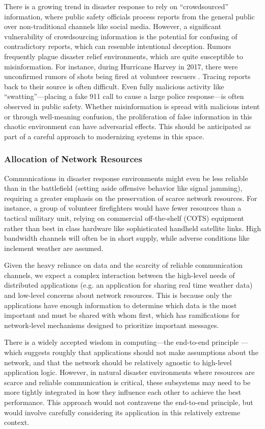 \documentclass[]             %
{NASA}                       %
\theoremstyle{definition}
\begin{document}
There is a growing trend in disaster response to rely on
``crowdsourced'' information, where public safety officials process
reports from the general public over non-traditional channels like
social media. However, a significant vulnerability of crowdsourcing
information is the potential for confusing of contradictory reports,
which can resemble intentional deception. Rumors frequently plague
disaster relief environments, which are quite susceptible to
misinformation. For instance, during Hurricane Harvey in 2017, there
were unconfirmed rumors of shots being fired at volunteer rescuers
\cite{2017:cajun-navy-rumors}. Tracing reports back to their source is
often difficult. Even fully malicious activity like
``swatting''---placing a fake 911 call to cause a large police
response---is often observed in public safety. Whether misinformation
is spread with malicious intent or through well-meaning confusion, the
proliferation of false information in this chaotic environment can
have adversarial effects. This should be anticipated as part of a
careful approach to modernizing systems in this space.

\subsubsection{Allocation of Network Resources}
\label{sssec:allocation-of-network-resource}
Communications in disaster response environments might even be less
reliable than in the battlefield (setting aside offensive behavior
like signal jamming), requiring a greater emphasis on the preservation
of scarce network resources. For instance, a group of volunteer
firefighters would have fewer resources than a tactical military unit,
relying on commercial off-the-shelf (COTS) equipment rather than best
in class hardware like sophisticated handheld satellite links. High
bandwidth channels will often be in short supply, while adverse
conditions like inclement weather are assumed.

Given the heavy reliance on data and the scarcity of reliable
communication channels, we expect a complex interaction between the
high-level needs of distributed applications (e.g. an application for
sharing real time weather data) and low-level concerns about network
resources. This is because only the applications have enough
information to determine which data is the most important and must be
shared with whom first, which has ramifications for network-level
mechanisms designed to prioritize important messages.

There is a widely accepted wisdom in computing---the end-to-end
principle \cite{1984:end-to-end}---which suggests roughly that
applications should not make assumptions about the network, and that
the network should be relatively agnostic to high-level application
logic. However, in natural disaster environments where resources are
scarce and reliable communication is critical, these subsystems may
need to be more tightly integrated in how they influence each other to
achieve the best performance. This approach would not contravene the
end-to-end principle, but would involve carefully considering its
application in this relatively extreme context.
\end{document}
